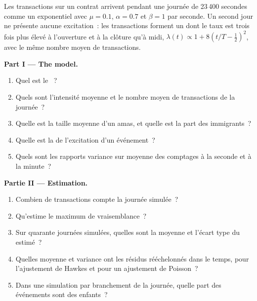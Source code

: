 \begin{problem}\label{pb:qm:point-processes-and-hawkes-processes:1}
Les transactions sur un contrat arrivent pendant une journée de 23\,400 secondes comme un  exponentiel avec $\mu = 0.1$, $\alpha =
0.7$ et $\beta = 1$ par seconde. Un second jour ne présente aucune excitation~: les transactions forment un 
dont le taux est trois fois plus élevé à l'ouverture et à la clôture qu'à midi, $\lambda(t) \propto 1 + 8(t/T -
\tfrac12)^2$, avec le même nombre moyen de transactions.

\medskip\noindent\textbf{Part I --- The model.}
\begin{enumerate}
\item Quel est le ~?
\item Quels sont l'intensité moyenne et le nombre moyen de transactions de la journée~?
\item Quelle est la taille moyenne d'un amas, et quelle est la part des immigrants~?
\item Quelle est la  de l'excitation d'un événement~?
\item Quels sont les rapports variance sur moyenne des comptages à la seconde et à la minute~?
\end{enumerate}

\medskip\noindent\textbf{Partie II --- Estimation.}
\begin{enumerate}[resume]
\item Combien de transactions compte la journée simulée~?
\item Qu'estime le maximum de vraisemblance~?
\item Sur quarante journées simulées, quelles sont la moyenne et l'écart type du  estimé~?
\item Quelles moyenne et variance ont les résidus rééchelonnés dans le temps, pour l'ajustement de Hawkes et pour un ajustement de Poisson~?
\item Dans une simulation par branchement de la journée, quelle part des événements sont des enfants~?
\end{enumerate}


\end{problem}

